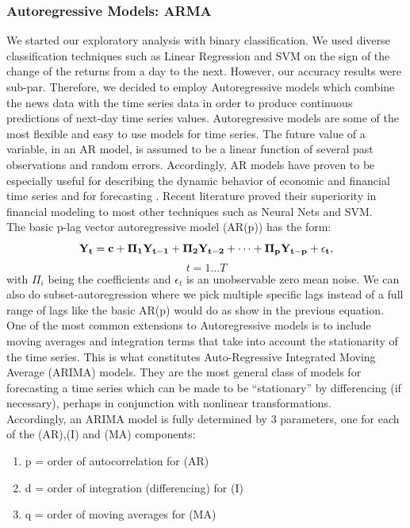 \subsubsection{Autoregressive Models: ARMA}
We started our exploratory analysis with binary classification. We used diverse classification techniques such as Linear Regression and SVM on the sign of the change of the returns from a day to the next. However, our accuracy results were sub-par. Therefore, we decided to employ Autoregressive models which combine the news data with the time series data in order to produce continuous predictions of next-day time series values. %
Autoregressive models are some of the most flexible and easy to use models for time series. The future value of a variable, in an AR model, is assumed to be a linear function of several past observations and random errors. Accordingly, AR models have proven to be especially useful for describing the dynamic behavior of economic and financial time series and for forecasting \cite{tsay, VAR}. Recent literature proved their superiority in financial modeling to most other techniques such as Neural Nets and SVM. \cite{comparison} \\
The basic p-lag vector autoregressive model (AR(p)) has the form: $$\bf{Y}_t=\bf{c}+\bf{\Pi}_1\bf{Y}_{t-1}+\bf{\Pi}_2\bf{Y}_{t-2}+\cdots+\bf{\Pi}_p\bf{Y}_{t-p}+\epsilon_t,$$ $$t=1\ldots T$$ with $\Pi_i$ being the coefficients and $\epsilon_t$ is an unobservable zero mean noise. We can also do subset-autoregression where we pick multiple specific lags instead of a full range of lags like the basic AR(p) would do as show in the previous equation.\\
One of the most common extensions to Autoregressive models is to include moving averages and integration terms that take into account the stationarity of the time series. This is what constitutes Auto-Regressive Integrated Moving Average (ARIMA) models. They are  the most general class of models for forecasting a time series which can be made to be “stationary” by differencing (if necessary), perhaps in conjunction with nonlinear transformations.\\
Accordingly, an ARIMA model is fully determined by 3 parameters, one for each of the (AR),(I) and (MA) components: %
\begin{enumerate}
	\item p = order of autocorrelation for (AR)
	\item d = order of integration (differencing) for (I)
	\item q = order of moving averages for (MA)
\end{enumerate}
